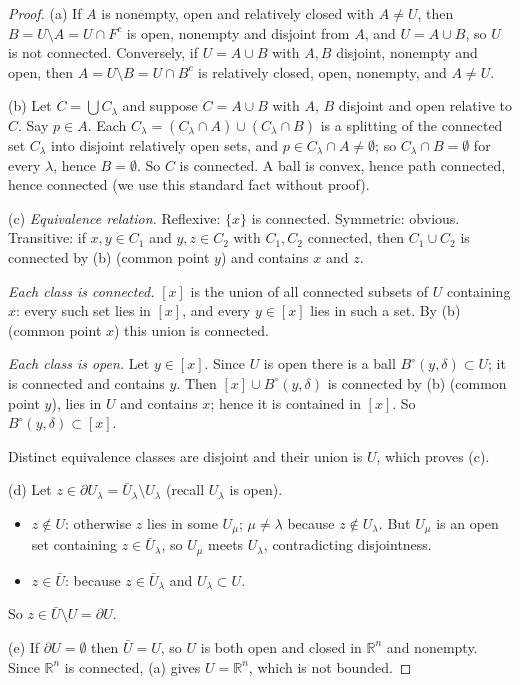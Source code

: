 \documentclass[11pt]{article}
\theoremstyle{plain}
\theoremstyle{definition}
\theoremstyle{remark}
\begin{document}
\begin{proof}
(a) If $A$ is nonempty, open and relatively closed with $A \neq U$, then $B = U \setminus A = U \cap F^c$ is open, nonempty and disjoint from $A$, and $U = A \cup B$, so $U$ is not connected. Conversely, if $U = A \cup B$ with $A, B$ disjoint, nonempty and open, then $A = U \setminus B = U \cap B^c$ is relatively closed, open, nonempty, and $A \neq U$.

(b) Let $C = \bigcup C_\lambda$ and suppose $C = A \cup B$ with $A$, $B$ disjoint and open relative to $C$. Say $p \in A$. Each $C_\lambda = (C_\lambda \cap A) \cup (C_\lambda\cap B)$ is a splitting of the connected set $C_\lambda$ into disjoint relatively open sets, and $p \in C_\lambda \cap A \neq \emptyset$; so $C_\lambda \cap B = \emptyset$ for every $\lambda$, hence $B = \emptyset$. So $C$ is connected. A ball is convex, hence path connected, hence connected (we use this standard fact without proof).

(c) \emph{Equivalence relation.} Reflexive: $\{x\}$ is connected. Symmetric: obvious. Transitive: if $x, y \in C_1$ and $y, z \in C_2$ with $C_1, C_2$ connected, then $C_1 \cup C_2$ is connected by (b) (common point $y$) and contains $x$ and $z$.

\emph{Each class is connected.} $[x]$ is the union of all connected subsets of $U$ containing $x$: every such set lies in $[x]$, and every $y \in [x]$ lies in such a set. By (b) (common point $x$) this union is connected.

\emph{Each class is open.} Let $y \in [x]$. Since $U$ is open there is a ball $B^\circ(y,\delta) \subset U$; it is connected and contains $y$. Then $[x] \cup B^\circ(y,\delta)$ is connected by (b) (common point $y$), lies in $U$ and contains $x$; hence it is contained in $[x]$. So $B^\circ(y,\delta) \subset [x]$.

Distinct equivalence classes are disjoint and their union is $U$, which proves (c).

(d) Let $z \in \partial U_\lambda = \bar U_\lambda \setminus U_\lambda$ (recall $U_\lambda$ is open).
\begin{itemize}
    \item $z \notin U$: otherwise $z$ lies in some $U_\mu$; $\mu \neq \lambda$ because $z \notin U_\lambda$. But $U_\mu$ is an open set containing $z \in \bar U_\lambda$, so $U_\mu$ meets $U_\lambda$, contradicting disjointness.
    \item $z \in \bar U$: because $z \in \bar U_\lambda$ and $U_\lambda \subset U$.
\end{itemize}
So $z \in \bar U \setminus U = \partial U$.

(e) If $\partial U = \emptyset$ then $\bar U = U$, so $U$ is both open and closed in $\mathbb{R}^n$ and nonempty. Since $\mathbb{R}^n$ is connected, (a) gives $U = \mathbb{R}^n$, which is not bounded.
\end{proof}
\end{document}
